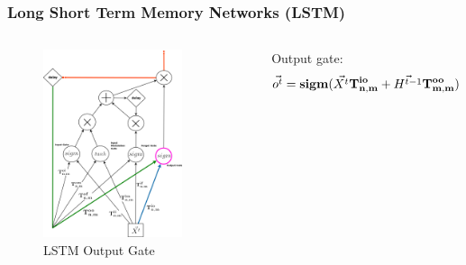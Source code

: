 \documentclass{beamer}
\begin{document}
\begin{frame}
\frametitle{Long Short Term Memory Networks (LSTM)}
\begin{columns}
\begin{figure}[t!]
    \centering
    \includegraphics[width=0.8\textwidth]{./pictures/figures/LSTM_output_gate.png}
    \caption{LSTM Output Gate}
    \label{fig:LSTM_output_gate}
\end{figure}

Output gate:
$$\vec{o^t} = \bold{sigm}(\vec{X^t}\bold{T_{n,m}^{io}} + \vec{H^{t-1}}\bold{T_{m,m}^{oo}})$$
\end{columns}
\end{frame}
\end{document}
